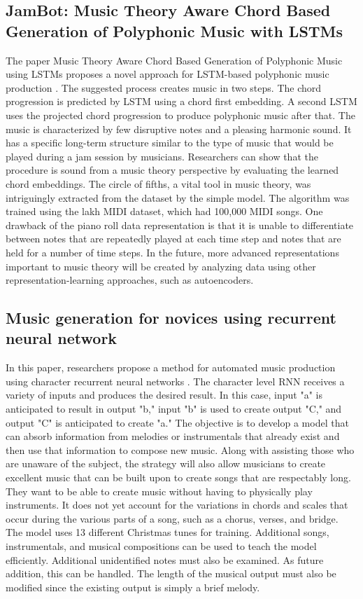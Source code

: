 \documentclass[letterpaper]{article}
\begin{document}
\subsection{JamBot: Music Theory Aware Chord Based Generation of Polyphonic Music with LSTMs}

The paper Music Theory Aware Chord Based Generation of Polyphonic Music using LSTMs proposes a novel approach for LSTM-based polyphonic music production \cite{b4}. The suggested process creates music in two steps. The chord progression is predicted by LSTM using a chord first embedding. A second LSTM uses the projected chord progression to produce polyphonic music after that. The music is characterized by few disruptive notes and a pleasing harmonic sound. It has a specific long-term structure similar to the type of music that would be played during a jam session by musicians. Researchers can show that the procedure is sound from a music theory perspective by evaluating the learned chord embeddings. The circle of fifths, a vital tool in music theory, was intriguingly extracted from the dataset by the simple model. The algorithm was trained using the lakh MIDI dataset, which had 100,000 MIDI songs. One drawback of the piano roll data representation is that it is unable to differentiate between notes that are repeatedly played at each time step and notes that are held for a number of time steps. In the future, more advanced representations important to music theory will be created by analyzing data using other representation-learning approaches, such as autoencoders.

\subsection{Music generation for novices using recurrent neural network}

In this paper, researchers propose a method for automated music production using character recurrent neural networks \cite{b3}. The character level RNN receives a variety of inputs and produces the desired result. In this case, input "a" is anticipated to result in output "b," input "b" is used to create output "C," and output "C" is anticipated to create "a." The objective is to develop a model that can absorb information from melodies or instrumentals that already exist and then use that information to compose new music. Along with assisting those who are unaware of the subject, the strategy will also allow musicians to create excellent music that can be built upon to create songs that are respectably long. They want to be able to create music without having to physically play instruments. It does not yet account for the variations in chords and scales that occur during the various parts of a song, such as a chorus, verses, and bridge. The model uses 13 different Christmas tunes for training. Additional songs, instrumentals, and musical compositions can be used to teach the model efficiently. Additional unidentified notes must also be examined. As future addition, this can be handled. The length of the musical output must also be modified since the existing output is simply a brief melody.
\end{document}
